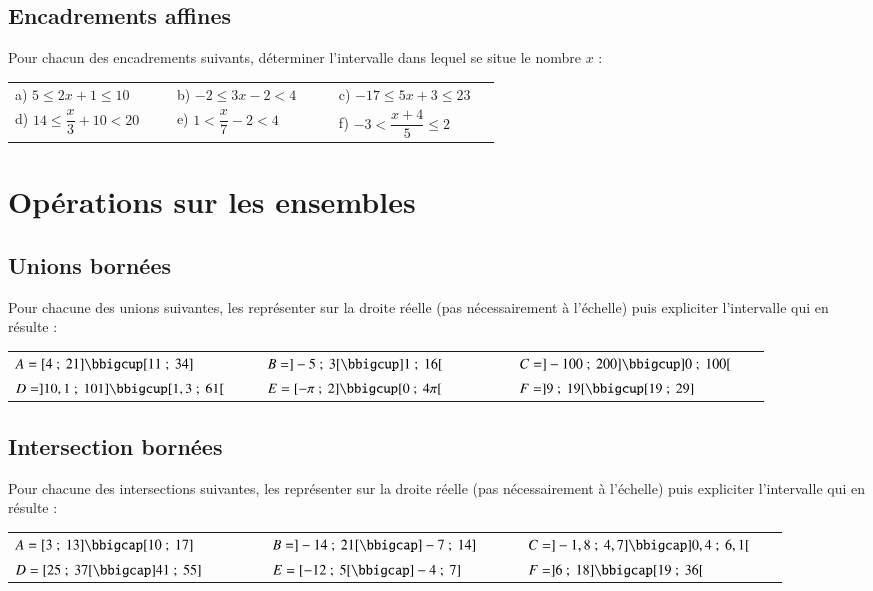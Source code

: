 \documentclass[oneside,12pt]{article}          %
\begin{document}
\subsection{Encadrements affines}
Pour chacun des encadrements suivants, déterminer l'intervalle dans lequel se situe le nombre $x$ :

\renewcommand{\arraystretch}{2}
\begin{tabular}{p{0.3\linewidth} p{0.3\linewidth} p{0.3\linewidth}}
	a) $5 \leq 2x+1 \leq 10$ & b) $-2 \leq 3x-2 < 4$ & c) $-17 \leq 5x+3 \leq 23$ \\
	d) $14 \leq \dfrac{x}{3}+10 < 20$ & e) $1 < \dfrac{x}{7}-2 < 4$ & f) $-3 < \dfrac{x+4}{5} \leq 2$
\end{tabular}



\section{Opérations sur les ensembles}

\subsection{Unions bornées}
Pour chacune des unions suivantes, les représenter sur la droite réelle (pas nécessairement à l'échelle) puis expliciter l'intervalle qui en résulte :

\begin{tabular}{p{0.3\linewidth} p{0.3\linewidth} p{0.3\linewidth}}
	$A = [4 ~;~ 21] \bbigcup [11 ~;~ 34]$ &
	$B = ]-5 ~;~ 3[ \bbigcup ]1 ~;~ 16[$ &
	$C = ]-100 ~;~ 200] \bbigcup ]0 ~;~ 100[$  \\
	$D = ]10,1 ~;~ 101] \bbigcup [1,3  ~;~  61[$ &
	$E = [-\pi ~;~ 2] \bbigcup [0 ~;~ 4\pi[$ &
	$F = ]9 ~;~ 19[ \bbigcup [19  ~;~ 29]$
\end{tabular}



\subsection{Intersection bornées}
Pour chacune des intersections suivantes, les représenter sur la droite réelle (pas nécessairement à l'échelle) puis expliciter l'intervalle qui en résulte :

\begin{tabular}{p{0.3\linewidth} p{0.3\linewidth} p{0.3\linewidth}}
	$A = [3 ~;~ 13] \bbigcap [10 ~;~ 17]$ &
	$B = ]-14 ~;~ 21[ \bbigcap ]-7 ~;~ 14] $ &
	$C = ]-1,8 ~;~ 4,7] \bbigcap ]0,4 ~;~ 6,1[ $  \\
	$D = [25 ~;~ 37[ \bbigcap ]41 ~;~ 55]$ &
	$E = [-12 ~;~ 5[ \bbigcap ]-4 ~;~ 7]$ &
	$F = ]6 ~;~ 18] \bbigcap [19 ~;~ 36[$
\end{tabular}
\end{document}
